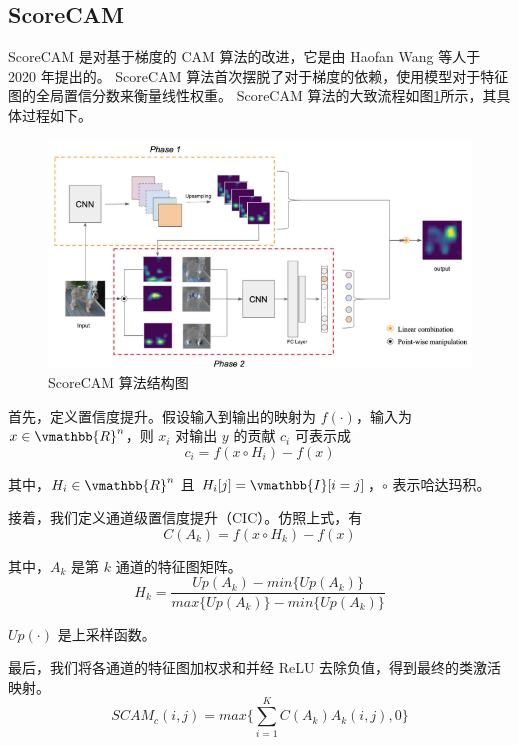 \documentclass[supercite]{Experimental_Report}
\theoremstyle{definition}
\begin{document}
\subsection{ScoreCAM}
ScoreCAM\cite{ScoreCAM} 是对基于梯度的 CAM 算法的改进，它是由 Haofan Wang 等人于 2020 年提出的。
ScoreCAM 算法首次摆脱了对于梯度的依赖，使用模型对于特征图的全局置信分数来衡量线性权重。
ScoreCAM 算法的大致流程如图\ref{ScoreCAM}所示，其具体过程如下。
\begin{figure}[H]
	\begin{center}
		\includegraphics[scale=0.8]{../images/ScoreCAM算法结构图.png}
		\caption{ScoreCAM 算法结构图}
		\label{ScoreCAM}
	\end{center}
\end{figure}

首先，定义置信度提升。假设输入到输出的映射为 $f(\cdot)$，输入为 $x\in \vmathbb{R}^n$，则 $x_i$ 对输出 $y$ 的贡献 $c_i$
可表示成
\begin{equation}
	c_i=f(x\circ H_i)-f(x)
\end{equation}

其中，$H_i\in \vmathbb{R}^n$ 且 $H_i[j]=\vmathbb{I}[i=j]$，$\circ$ 表示哈达玛积。

接着，我们定义通道级置信度提升（CIC）。仿照上式，有
\begin{equation}
	C(A_k)=f(x\circ H_k)-f(x)
\end{equation}

其中，$A_k$ 是第 $k$ 通道的特征图矩阵。
\begin{equation}
	H_k=\frac{Up(A_k)-min\{Up(A_k)\}}{max\{Up(A_k)\}-min\{Up(A_k)\}}
\end{equation}

$Up(\cdot)$ 是上采样函数。

最后，我们将各通道的特征图加权求和并经 ReLU 去除负值，得到最终的类激活映射。
\begin{equation}
	SCAM_c(i,j)=max\{\sum_{i=1}^{K}C(A_k)A_k(i,j), 0\}
\end{equation}
\end{document}
